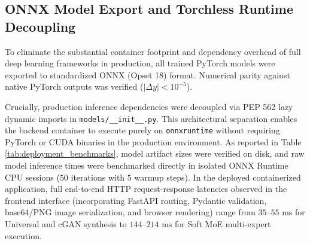 \documentclass[conference]{IEEEtran}
\begin{document}
\subsection{ONNX Model Export and Torchless Runtime Decoupling}
To eliminate the substantial container footprint and dependency overhead of full deep learning frameworks in production, all trained PyTorch models were exported to standardized ONNX (Opset 18) format. Numerical parity against native PyTorch outputs was verified ($|\Delta y| < 10^{-5}$).

Crucially, production inference dependencies were decoupled via PEP 562 lazy dynamic imports in \texttt{models/\_\_init\_\_.py}. This architectural separation enables the backend container to execute purely on \texttt{onnxruntime} without requiring PyTorch or CUDA binaries in the production environment. As reported in Table \ref{tab:deployment_benchmarks}, model artifact sizes were verified on disk, and raw model inference times were benchmarked directly in isolated ONNX Runtime CPU sessions ($50$ iterations with $5$ warmup steps). In the deployed containerized application, full end-to-end HTTP request-response latencies observed in the frontend interface (incorporating FastAPI routing, Pydantic validation, base64/PNG image serialization, and browser rendering) range from $35$--$55\text{ ms}$ for Universal and cGAN synthesis to $144$--$214\text{ ms}$ for Soft MoE multi-expert execution.
\end{document}
